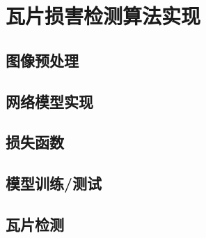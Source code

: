 \section{瓦片损害检测算法实现}
\setcounter{figure}{0}

\subsection{图像预处理}

\subsection{网络模型实现}

\subsection{损失函数}

\subsection{模型训练/测试}

\subsection{瓦片检测}
